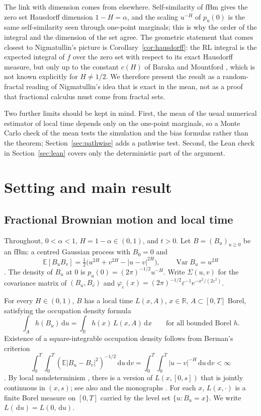 \documentclass[11pt]{article}
\theoremstyle{remark}
\theoremstyle{definition}
\newcommand{\E}{\mathbb{E}}
\newcommand{\R}{\mathbb{R}}
\newcommand{\dd}{\,\mathrm{d}}
\begin{document}
The link with dimension comes from elsewhere. Self-similarity of fBm gives the zero set Hausdorff dimension $1-H=\alpha$, and the scaling $u^{-H}$ of $p_u(0)$ is the same self-similarity seen through one-point marginals; this is why the order of the integral and the dimension of the set agree. The geometric statement that comes closest to Nigmatullin's picture is Corollary~\ref{cor:hausdorff}: the RL integral is the expected integral of $f$ over the zero set with respect to its exact Hausdorff measure, but only up to the constant $c(H)$ of Baraka and Mountford \cite{BM11}, which is not known explicitly for $H\neq1/2$. We therefore present the result as a random-fractal reading of Nigmatullin's idea that is exact in the mean, not as a proof that fractional calculus must come from fractal sets.

Two further limits should be kept in mind. First, the mean of the usual numerical estimator of local time depends only on the one-point marginals, so a Monte Carlo check of the mean tests the simulation and the bias formulas rather than the theorem; Section~\ref{sec:pathwise} adds a pathwise test. Second, the Lean check in Section~\ref{sec:lean} covers only the deterministic part of the argument.

\section{Setting and main result}\label{sec:main}

\subsection{Fractional Brownian motion and local time}
Throughout, $0<\alpha<1$, $H=1-\alpha\in(0,1)$, and $t>0$. Let $B=(B_u)_{u\ge0}$ be an fBm: a centred Gaussian process with $B_0=0$ and
\[
\E[B_uB_v]=\tfrac12\big(u^{2H}+v^{2H}-|u-v|^{2H}\big),\qquad \operatorname{Var}B_u=u^{2H}
\]
\cite{MvN68}. The density of $B_u$ at $0$ is $p_u(0)=(2\pi)^{-1/2}u^{-H}$. Write $\Sigma(u,v)$ for the covariance matrix of $(B_u,B_v)$ and $\varphi_\varepsilon(x)=(2\pi)^{-1/2}\varepsilon^{-1}e^{-x^2/(2\varepsilon^2)}$.

For every $H\in(0,1)$, $B$ has a local time $L(x,A)$, $x\in\R$, $A\subset[0,T]$ Borel, satisfying the occupation density formula
\begin{equation}\label{eq:OD}
\int_A h(B_u)\dd u=\int_\R h(x)\,L(x,A)\dd x\qquad\text{for all bounded Borel } h .
\end{equation}
Existence of a square-integrable occupation density follows from Berman's criterion
\[\int_0^T\!\!\int_0^T(\E|B_u-B_v|^2)^{-1/2}\dd u\dd v=\int_0^T\!\!\int_0^T|u-v|^{-H}\dd u\dd v<\infty\]
\cite{Ber69,GH80}. By local nondeterminism \cite{Ber73,Pit78}, there is a version of $L(x,[0,s])$ that is jointly continuous in $(x,s)$; see also \cite{Xia97} and the monographs \cite{BHOZ08,Mis08}. For each $x$, $L(x,\cdot)$ is a finite Borel measure on $[0,T]$ carried by the level set $\{u:B_u=x\}$. We write $L(\dd u)=L(0,\dd u)$.
\end{document}
